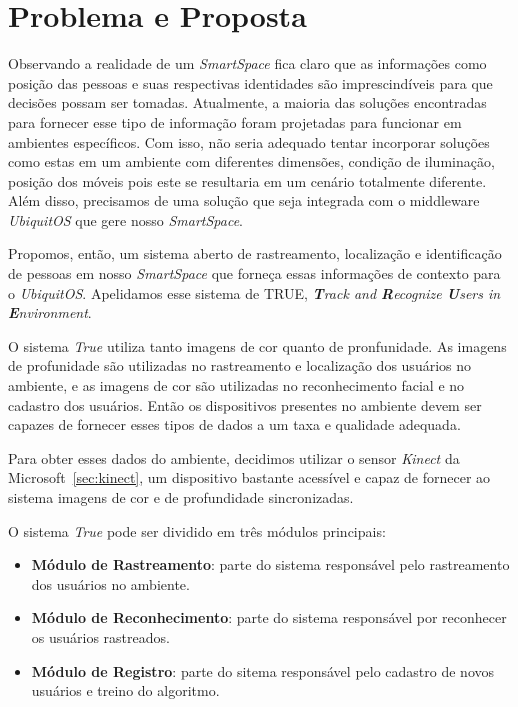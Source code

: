 \chapter{Problema e Proposta}

Observando a realidade de um \textit{SmartSpace} fica claro que as informações como posição das pessoas e suas respectivas identidades são imprescindíveis para que decisões possam ser tomadas. Atualmente, a maioria das soluções encontradas para fornecer esse tipo de informação foram projetadas para funcionar em ambientes específicos. Com isso, não seria adequado tentar incorporar soluções como estas em um ambiente com diferentes dimensões, condição de iluminação, posição dos móveis pois este se resultaria em um cenário totalmente diferente. Além disso, precisamos de uma solução que seja integrada com o middleware \textit{UbiquitOS} que gere nosso \textit{SmartSpace}.

Propomos, então, um sistema aberto de rastreamento, localização e identificação de pessoas em nosso \textit{SmartSpace} que forneça essas informações de contexto para o \textit{UbiquitOS}. Apelidamos esse sistema de TRUE, \textit{\textbf{T}rack and \textbf{R}ecognize \textbf{U}sers in \textbf{E}nvironment}.

O sistema \textit{True} utiliza tanto imagens de cor quanto de pronfunidade. As imagens de profunidade são utilizadas no rastreamento e localização dos usuários no ambiente, e as imagens de cor são utilizadas no reconhecimento facial e no cadastro dos usuários. Então os dispositivos presentes no ambiente devem ser capazes de fornecer esses tipos de dados a um taxa e qualidade adequada. 

Para obter esses dados do ambiente, decidimos utilizar o sensor \textit{Kinect} da Microsoft~\ref{sec:kinect}, um dispositivo bastante acessível e capaz de fornecer ao sistema imagens de cor e de profundidade sincronizadas.

O sistema \textit{True} pode ser dividido em três módulos principais:

	\begin{itemize}
		\item \textbf{Módulo de Rastreamento}: parte do sistema responsável pelo rastreamento dos usuários no ambiente.
		\item \textbf{Módulo de Reconhecimento}: parte do sistema responsável por reconhecer os usuários rastreados.
		\item \textbf{Módulo de Registro}: parte do sitema responsável pelo cadastro de novos usuários e treino do algoritmo.
	\end{itemize}

